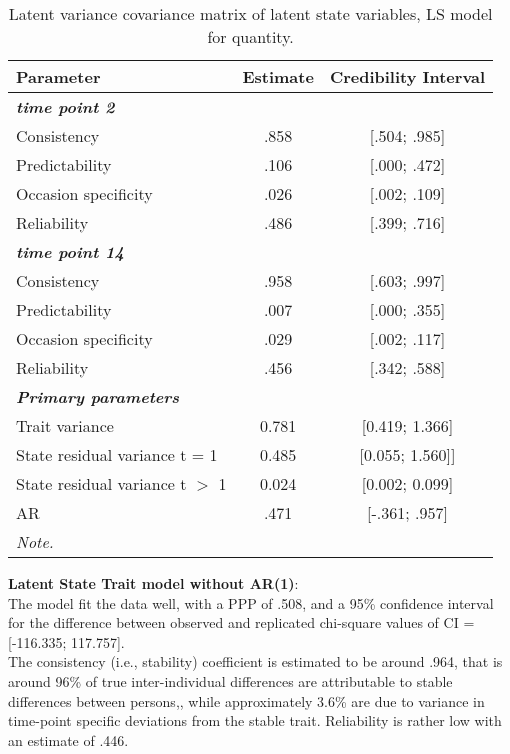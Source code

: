 \begin{table}[H]
 \setlength{\tabcolsep}{1mm}
 \begin{center}
        \caption[Correlation latent State quant]{Latent variance covariance matrix of latent state variables, LS model for quantity.}
        \label{Tab: correlations LS quant}
            {\footnotesize
            \begin{tabular}{lcc}
            \hline  
          Parameter & Estimate & Credibility Interval\\
         \hline 
         \textbf{\textit{time point 2}} & & \\
           Consistency & .858 & [.504; .985] \\
           Predictability& .106& [.000; .472]\\
           Occasion specificity & .026&[.002; .109] \\
           Reliability &.486& [.399; .716] \\
             \textbf{\textit{time point 14}} & & \\
           Consistency & .958 &[.603; .997] \\
           Predictability& .007&[.000; .355] \\
           Occasion specificity & .029&[.002; .117] \\
           Reliability &.456& [.342; .588] \\
            \textbf{\textit{Primary parameters}} & & \\
            Trait variance & 0.781& [0.419; 1.366] \\
             State residual variance t = 1 &  0.485 & [0.055; 1.560]] \\
             State residual variance  t $>$ 1 & 0.024 & [0.002; 0.099] \\
              AR  & .471 & [-.361; .957] \\
 \hline 
\multicolumn{3}{p{0.4\textwidth}}{\scriptsize{\textit{Note.}}} \\
            \end{tabular}}
        \end{center}
        \end{table}


  \textbf{Latent State Trait model without AR(1)}: \\
The model fit the data well, with a PPP of .508, and a 95\% confidence interval for the difference between observed and replicated chi-square values of CI = [-116.335; 117.757].  \\
The consistency (i.e., stability) coefficient is estimated to be around .964, that is around 96\% of true inter-individual differences are attributable to stable differences between persons,, while approximately 3.6\% are due to variance in time-point specific deviations from the stable trait. Reliability is rather low with an estimate of .446.


